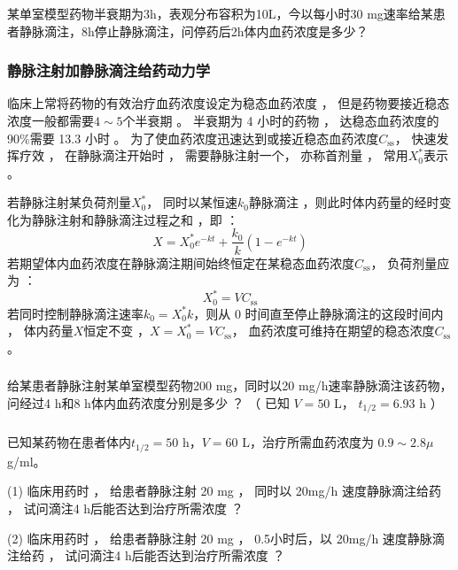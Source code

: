 \documentclass[dvipsnames, svgnames, x11names]{beamer}
\begin{document}
\begin{frame}[t]
    \frametitle{}
    \begin{example}
        某单室模型药物半衰期为3h，表观分布容积为10L，今以每小时30 mg速率给某患者静脉滴注，8h停止静脉滴注，问停药后2h体内血药浓度是多少？
    \end{example}
\end{frame}



\begin{frame}
    \frametitle{静脉注射加静脉滴注给药动力学}
    临床上常将药物的有效治疗血药浓度设定为稳态血药浓度 ， 但是药物要接近稳态浓度一般都需要$4\sim 5$个半衰期 。 半衰期为 4 小时的药物 ， 达稳态血药浓度的 90\%需要 13.3 小时 。 为了使血药浓度迅速达到或接近稳态血药浓度$C_\mathrm{ss}$， 快速发挥疗效 ， 在静脉滴注开始时 ， 需要静脉注射一个， 亦称首剂量 ， 常用$X_0^*$表示 。

    若静脉注射某负荷剂量$X_0^*$， 同时以某恒速$k_0$静脉滴注 ，则此时体内药量的经时变化为静脉注射和静脉滴注过程之和 ，即 ：
    \[
        X=X_{0}^{*}e^{-kt}+\frac{k_{0}}{k}(1-e^{-kt})
    \]
    若期望体内血药浓度在静脉滴注期间始终恒定在某稳态血药浓度$C_\mathrm{ss}$， 负荷剂量应为 ：
    \[
        X_{0}^{*}=VC_\mathrm{ss}
    \]
    若同时控制静脉滴注速率$k_{0}=X_{0}^{*}k$，则从 0 时间直至停止静脉滴注的这段时间内 ， 体内药量$X$恒定不变 ，$X=X_{0}^{*}=VC_\mathrm{ss}$， 血药浓度可维持在期望的稳态浓度$C_\mathrm{ss}$。
\end{frame}


\begin{frame}[t]
    \frametitle{}
    \begin{example}
        给某患者静脉注射某单室模型药物200 mg，同时以20 mg/h速率静脉滴注该药物，问经过4 h和8 h体内血药浓度分别是多少 ？ （ 已知 $V=50$ L， $t_{1/2}= 6.93$ h ）
    \end{example}
\end{frame}


\begin{frame}[t]
    \frametitle{}
    \begin{question}
        已知某药物在患者体内$t_{1/2}= 50$ h，$V=60$ L，治疗所需血药浓度为 $0.9\sim 2.8 \mu$g/ml。 
        
        (1) 临床用药时 ， 给患者静脉注射 20 mg ， 同时以 20mg/h 速度静脉滴注给药 ， 试问滴注4 h后能否达到治疗所需浓度 ？

        (2) 临床用药时 ， 给患者静脉注射 20 mg ， 0.5小时后，以 20mg/h 速度静脉滴注给药 ， 试问滴注4 h后能否达到治疗所需浓度 ？
    \end{question}
\end{frame}
\end{document}
